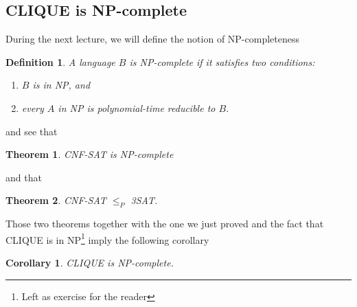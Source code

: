 \documentclass{article}
\newcommand{\theoremname}{Theorem}
\newcommand{\corollaryname}{Corollary}
\newcommand{\definitionname}{Definition}
\newtheorem{theorem}{\theoremname}
\newtheorem{corollary}{\corollaryname}
\newtheorem{definition}{\definitionname}
\begin{document}
\subsection{CLIQUE is NP-complete}

During the next lecture, we will define the notion of NP-completeness
\begin{definition}
	A language \(B\) is NP-complete if it satisfies two conditions:
	\begin{enumerate}
		\item \(B\) is in NP, and
		\item every \(A\) in NP is polynomial-time reducible to \(B\).
	\end{enumerate}
\end{definition}
and see that
\begin{theorem}
	CNF-SAT is NP-complete
\end{theorem}
and that
\begin{theorem}
	CNF-SAT \(\le_P\) 3SAT.
\end{theorem}
Those two theorems together with the one we just proved and the fact that
CLIQUE is in NP\footnote{Left as exercise for the reader}
imply the following corollary
\begin{corollary}
	CLIQUE is NP-complete.
\end{corollary}
\end{document}
